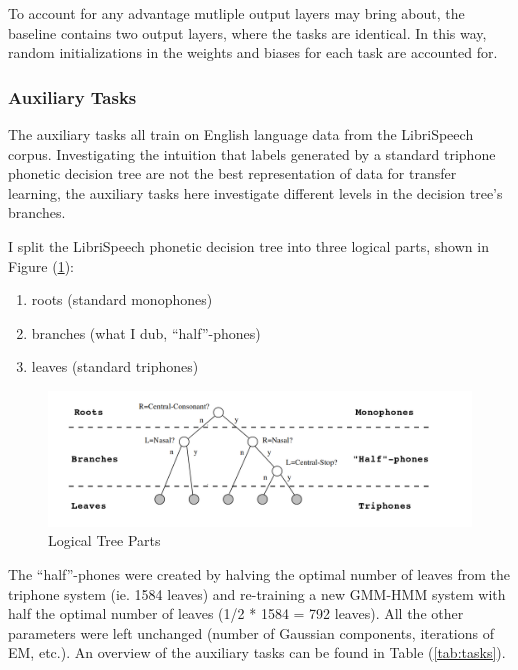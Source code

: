 \documentclass[a4paper]{article}
\begin{document}
To account for any advantage mutliple output layers may bring about, the baseline contains two output layers, where the tasks are identical. In this way, random initializations in the weights and biases for each task are accounted for.

\subsubsection{Auxiliary Tasks}

The auxiliary tasks all train on English language data from the LibriSpeech corpus. Investigating the intuition that labels generated by a standard triphone phonetic decision tree are not the best representation of data for transfer learning, the auxiliary tasks here investigate different levels in the decision tree's branches.

I split the LibriSpeech phonetic decision tree into three logical parts, shown in Figure (\ref{fig:tree-parts}):

\begin{enumerate}
\item roots (standard monophones)
\item branches (what I dub, ``half''-phones)
\item leaves (standard triphones)
\end{enumerate}




\begin{figure}[!htbp]
  \centering
{}
  \includegraphics[width=\linewidth]{figs/levels.png}
  \caption{Logical Tree Parts}
  \label{fig:tree-parts}
\endminipage\hfill
\end{figure}


The ``half''-phones were created by halving the optimal number of leaves from the triphone system (ie. 1584 leaves) and re-training a new GMM-HMM system with half the optimal number of leaves (1/2 * 1584 = 792 leaves). All the other parameters were left unchanged (number of Gaussian components, iterations of EM, etc.). An overview of the auxiliary tasks can be found in Table (\ref{tab:tasks}).
\end{document}
